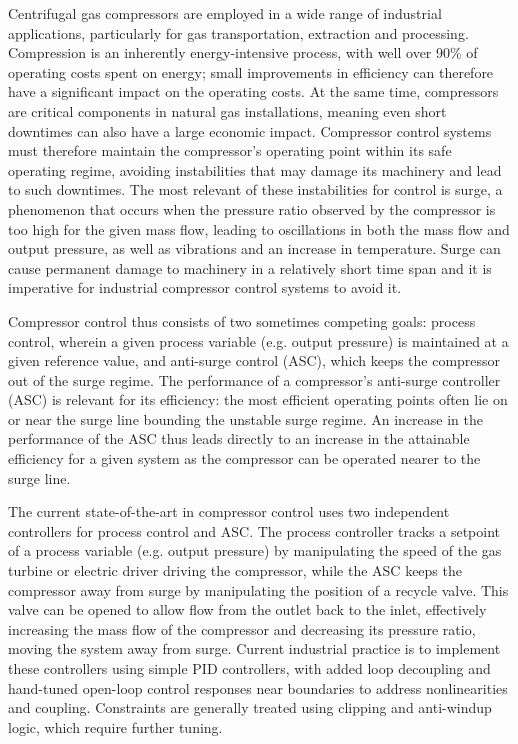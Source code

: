 Centrifugal gas compressors are employed in a wide range of industrial applications, particularly for gas transportation, extraction and processing.
Compression is an inherently energy-intensive process, with well over 90\% of operating costs spent on energy; small improvements in efficiency can therefore have a significant impact on the operating costs.
At the same time, compressors are critical components in natural gas installations, meaning even short downtimes can also have a large economic impact.
Compressor control systems must therefore maintain the compressor's operating point within its safe operating regime, avoiding instabilities that may damage its machinery and lead to such downtimes.
The most relevant of these instabilities for control is surge, a phenomenon that occurs when the pressure ratio observed by the compressor is too high for the given mass flow, leading to oscillations in both the mass flow and output pressure, as well as vibrations and an increase in temperature.
Surge can cause permanent damage to machinery in a relatively short time span and it is imperative for industrial compressor control systems to avoid it.

Compressor control thus consists of two sometimes competing goals: process control, wherein a given process variable (e.g. output pressure) is maintained at a given reference value, and anti-surge control (ASC), which keeps the compressor out of the surge regime.
The performance of a compressor's anti-surge controller (ASC) is relevant for its efficiency: the most efficient operating points often lie on or near the surge line bounding the unstable surge regime.
An increase in the performance of the ASC thus leads directly to an increase in the attainable efficiency for a given system as the compressor can be operated nearer to the surge line.

The current state-of-the-art in compressor control uses two independent controllers for process control and ASC.
The process controller tracks a setpoint of a process variable (e.g. output pressure) by manipulating the speed of the gas turbine or electric driver driving the compressor, while the ASC keeps the compressor away from surge by manipulating the position of a recycle valve.
This valve can be opened to allow flow from the outlet back to the inlet, effectively increasing the mass flow of the compressor and decreasing its pressure ratio, moving the system away from surge.
Current industrial practice is to implement these controllers using simple PID controllers, with added loop decoupling and hand-tuned open-loop control responses near boundaries to address nonlinearities and coupling.
Constraints are generally treated using clipping and anti-windup logic, which require further tuning.

